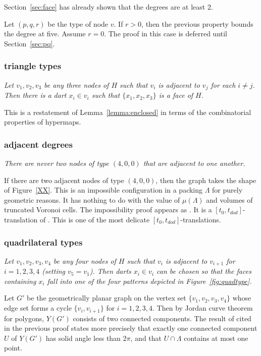 Section~\ref{sec:face} has already shown that the degrees are at least $2$.

Let $(p,q,r)$ be the type of node $v$.  If $r>0$, then the previous
property bounds the degree at five.  Assume $r=0$.  The
proof in this case is deferred until Section~\ref{sec:pq}.

\subsubsection{triangle types}

{\it Let $v_1,v_2,v_3$ be any three nodes of $H$ such that $v_i$ is adjacent to $v_j$
for each $i\ne j$.  Then there is a dart $x_i\in v_i$ such that $\{x_1,x_2,x_3\}$ is
a face of $H$.}

This is a restatement of Lemma~\ref{lemma:enclosed} in terms of the combinatorial
properties of hypermaps.


\subsubsection{adjacent degrees}

{\it There are never two nodes of type $(4,0,0)$ that are adjacent to one another.}

If there are two adjacent nodes of type $(4,0,0)$, then the graph takes the
shape of Figure~\ref{XX}.  This is an impossible configuration in a packing $\Lambda$
for purely geometric reasons.  It has nothing to do with the value of $\mu(\Lambda)$
and volumes of truncated Voronoi cells.
The impossibility proof appears as \cite[Lemma~3.8]{arx}. It is a $[t_0,t_{dod}]$-translation
of \cite[Prop.4.2]{Part1}.  This is one of the most delicate $[t_0,t_{dod}]$-translations.



\subsubsection{quadrilateral types}


{\it Let $v_1,v_2,v_3,v_4$ be any four nodes of $H$ such that $v_i$ is adjacent
to $v_{i+1}$ for $i=1,2,3,4$ (setting $v_5=v_1$).  Then darts $x_i\in v_i$ can be chosen
so that the faces containing $x_i$ fall into one of the four patterns depicted
in Figure~\ref{fig:quadtype}.}

Let $G'$ be the geometrically planar graph on the vertex set $\{v_1,v_2,v_3,v_4\}$
whose edge set forms a cycle $\{v_i,v_{i+1}\}$ for $i=1,2,3,4$.  Then by
Jordan curve theorem for polygons, $Y(G')$ consists of two connected components.
The result of \cite[Lemma~3.8]{arx} cited in the previous proof states more precisely
that exactly one connected component $U$ of $Y(G')$ has solid angle less than $2\pi$,
and that $U\cap\Lambda$ contains at most one point.

